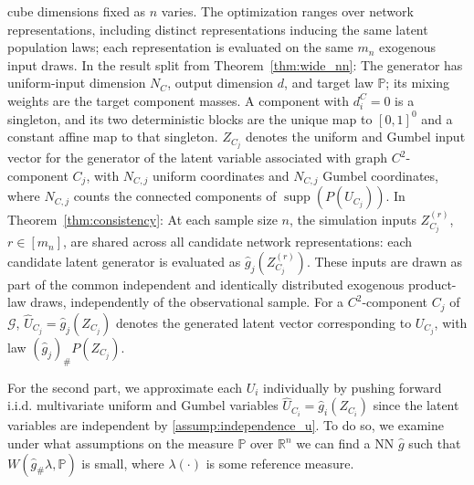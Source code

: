 \documentclass[12pt]{article}
\theoremstyle{plain}
\theoremstyle{definition}
\theoremstyle{remark}
\begin{document}
cube dimensions fixed as $n$ varies. The optimization ranges over network representations, including distinct representations inducing the same latent population laws; each representation is evaluated on the same $m_n$ exogenous input draws. In the result split from Theorem~\ref{thm:wide_nn}: The generator has uniform-input dimension $N_C$, output dimension $d$, and target law $\mathbb{P}$; its mixing weights are the target component masses. A component with $d_i^C=0$ is a singleton, and its two deterministic blocks are the unique map to $[0,1]^0$ and a constant affine map to that singleton. $Z_{C_j}$ denotes the uniform and Gumbel input vector for the generator of the latent variable associated with graph $C^2$-component $C_j$, with $N_{C,j}$ uniform coordinates and $N_{C,j}$ Gumbel coordinates, where $N_{C,j}$ counts the connected components of $\operatorname{supp}(P(U_{C_j}))$. In Theorem~\ref{thm:consistency}: At each sample size $n$, the simulation inputs $Z_{C_j}^{(r)}$, $r\in[m_n]$, are shared across all candidate network representations: each candidate latent generator is evaluated as $\hat g_j(Z_{C_j}^{(r)})$. These inputs are drawn as part of the common independent and identically distributed exogenous product-law draws, independently of the observational sample. For a $C^2$-component $C_j$ of $\mathcal{G}$, $\hat{U}_{C_j}=\hat{g}_j(Z_{C_j})$ denotes the generated latent vector corresponding to $U_{C_j}$, with law $(\hat{g}_j)_{\#}P(Z_{C_j})$.


For the second part, we approximate each $ U_i $ individually by pushing forward i.i.d. multivariate uniform and Gumbel variables $ \hat{U}_{C_i} = \hat{g}_i(Z_{C_i}) $ since the latent variables are independent by \cref{assump:independence_u}. To do so, we examine under what assumptions on the measure $ \mathbb{P}$ over $ \mathbb{R}^{n}$ we can find a NN $ \hat{g}$ such that $ W(\hat{g}_{\#} \lambda, \mathbb{P}) $ is small, where $ \lambda(\cdot) $ is some reference measure.\par
\end{document}
